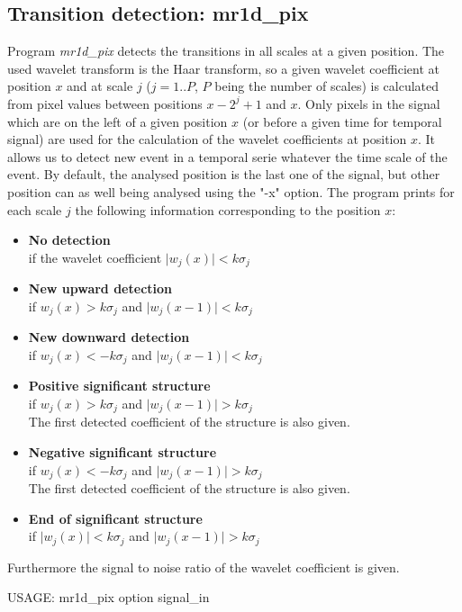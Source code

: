 \subsection{Transition detection: mr1d\_pix}
Program {\em mr1d\_pix} detects the transitions in all scales at a 
given position. The used wavelet transform is the Haar transform,
so a given wavelet coefficient at position $x$ and at scale $j$ ($j=1..P$,
$P$ being the number of scales)
is calculated from pixel values between  positions $x-2^{j}+1$ and $x$.
Only pixels in the signal which are on the left of a given position $x$
(or before a given time for temporal signal) are
used for the calculation of the wavelet coefficients at position $x$.
It allows us to detect new event in a temporal serie whatever the time 
scale of the event.
By default, the analysed position is the last one of the signal, but other
position can as well being analysed using the "-x" option. The program
prints for each scale $j$ the following information corresponding to 
the position $x$:
\begin{itemize}
\item {\bf No detection} \\
 if the wavelet coefficient $\mid w_j(x) \mid  < k \sigma_j$
\item {\bf New upward detection}\\
 if $  w_j(x) > k \sigma_j$  and $\mid w_j(x-1) \mid  < k \sigma_j$
\item {\bf New downward detection}\\
 if $  w_j(x) < - k \sigma_j$ and $\mid w_j(x-1) \mid  < k \sigma_j$
\item {\bf Positive significant structure}\\
 if $  w_j(x) > k \sigma_j$ and $\mid w_j(x-1) \mid  > k \sigma_j$ \\
The first detected coefficient of the structure is also given.
\item {\bf Negative significant structure}\\
 if $  w_j(x) < -k \sigma_j$ and $\mid w_j(x-1) \mid  > k \sigma_j$ \\
The first detected coefficient of the structure is also given.
\item {\bf End of significant structure}\\
 if $\mid w_j(x) \mid  < k \sigma_j$ and $\mid w_j(x-1) \mid  > k \sigma_j$
\end{itemize}
Furthermore the signal to noise ratio of the wavelet coefficient is given.
{\bf
\begin{center}
 USAGE: mr1d\_pix option signal\_in  
\end{center}}
